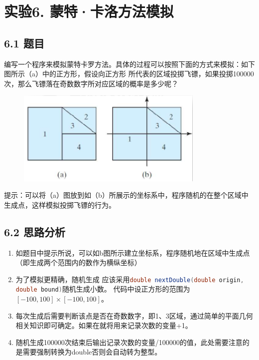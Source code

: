 \vspace{-3cm}\chapter{实验6. 蒙特·卡洛方法模拟}

\section{6.1 题目}

编写一个程序来模拟蒙特卡罗方法。具体的过程可以按照下面的方式来模拟：如下图所示（a）中的正方形，假设向正方形
所代表的区域投掷飞镖，如果投掷100000次，那么飞镖落在奇数数字所对应区域的概率是多少呢？ 

\begin{figure}[H]
    \centering
    \includegraphics[width = 0.8\textwidth]{../pic/6/6.0.png}
\end{figure}

提示：可以将（a）图放到如（b）所展示的坐标系中，程序随机的在整个区域中生成点，这样模拟投掷飞镖的行为。

\section{6.2 思路分析}
\begin{enumerate}
    \item 如题目中提示所说，可以如b图所示建立坐标系，程序随机地在区域中生成点（即生成两个范围内的数作为横纵坐标）
    \item 为了模拟更精确，随机生成
        应该采用\lstinline[language = Java]{double nextDouble(double origin, double bound)}随机生成小数。
        代码中设正方形的范围为$[-100,100]\times[-100,100]$。
    \item 每次生成后需要判断该点是否在奇数数字，即1、3区域，通过简单的平面几何相关知识即可确定。如果在就将用来记录次数的变量+1。
    \item 随机生成100000次结束后输出记录次数的变量/100000的值，此处需要注意的是需要强制转换为double否则会自动转为整型。
\end{enumerate}

